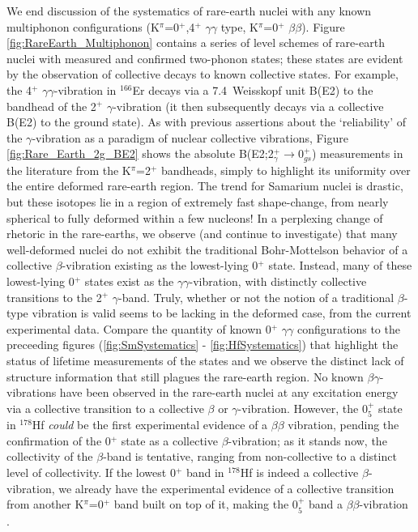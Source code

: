 We end discussion of the systematics of rare-earth nuclei with any known multiphonon configurations (K$^\pi$=0$^+$,4$^+$ $\gamma\gamma$ type, K$^\pi$=0$^+$ $\beta\beta$). Figure \ref{fig:RareEarth_Multiphonon} contains a series of level schemes of rare-earth nuclei with measured and confirmed two-phonon states; these states are evident by the observation of collective decays to known collective states. For example, the 4$^+$ $\gamma\gamma$-vibration in $^{166}$Er decays via a 7.4~Weisskopf unit B(E2) to the bandhead of the 2$^+$ $\gamma$-vibration (it then subsequently decays via a collective B(E2) to the ground state). As with previous assertions about the `reliability' of the $\gamma$-vibration as a paradigm of nuclear collective vibrations, Figure \ref{fig:Rare_Earth_2g_BE2} shows the absolute  B(E2;2$^+_\gamma\rightarrow$0$^+_{gs}$) measurements in the literature from the K$^\pi$=2$^+$ bandheads, simply to highlight its uniformity over the entire deformed rare-earth region. The trend for Samarium nuclei is drastic, but these isotopes lie in a region of extremely fast shape-change, from nearly spherical to fully deformed within a few nucleons! In a perplexing change of rhetoric in the rare-earths, we observe (and continue to investigate) that many well-deformed nuclei do not exhibit the traditional Bohr-Mottelson behavior of a collective $\beta$-vibration existing as the lowest-lying 0$^+$ state. Instead, many of these lowest-lying 0$^+$ states exist as the $\gamma\gamma$-vibration, with distinctly collective transitions to the 2$^+$ $\gamma$-band. Truly, whether or not the notion of a traditional $\beta$-type vibration is valid seems to be lacking in the deformed case, from the current experimental data. Compare the quantity of known 0$^+$ $\gamma\gamma$ configurations to the preceeding figures (\ref{fig:SmSystematics} - \ref{fig:HfSystematics}) that highlight the status of lifetime measurements of the states and we observe the distinct lack of structure information that still plagues the rare-earth region. No known $\beta\gamma$-vibrations have been observed in the rare-earth nuclei at any excitation energy via a collective transition to a collective $\beta$ or $\gamma$-vibration. However, the 0$^+_5$ state in $^{178}$Hf \textit{could} be the first experimental evidence of a $\beta\beta$ vibration, pending the confirmation of the 0$^+$ state as a collective $\beta$-vibration; as it stands now, the collectivity of the $\beta$-band is tentative, ranging from non-collective to a distinct level of collectivity. If the lowest 0$^+$ band in $^{178}$Hf is indeed a collective $\beta$-vibration, we already have the experimental evidence of a collective transition from another K$^\pi$=0$^+$ band built on top of it, making the 0$^+_5$ band a $\beta\beta$-vibration \cite{Aprahamian2002}.

